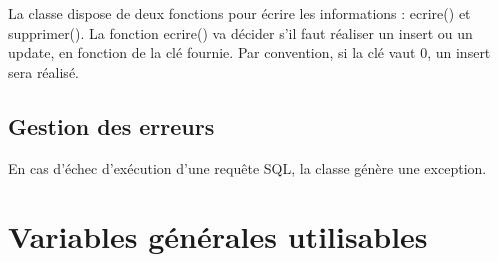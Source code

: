 La classe dispose de deux fonctions pour écrire les informations : ecrire() et supprimer(). La fonction ecrire() va décider s'il faut réaliser un insert ou un update, en fonction de la clé fournie. Par convention, si la clé vaut 0, un insert sera réalisé.

\subsection{Gestion des erreurs}

En cas d'échec d'exécution d'une requête SQL, la classe génère une exception.

\section{Variables générales utilisables}

